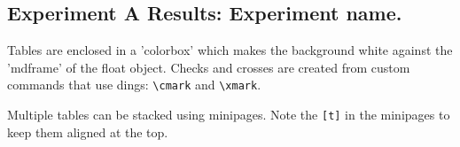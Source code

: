 \subsection{Experiment A Results: Experiment name.}
\label{sec:3-exp_a_results}

Tables are enclosed in a 'colorbox' which makes the background white against the 'mdframe' of the float object. Checks and crosses are created from custom commands that use dings: \texttt{\textbackslash cmark} and \texttt{\textbackslash xmark}.



Multiple tables can be stacked using minipages. Note the \texttt{[t]} in the minipages to keep them aligned at the top.



